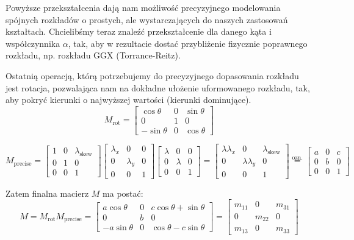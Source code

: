 \documentclass[../main.tex]{subfiles}
\begin{document}
Powyższe przekształcenia dają nam możliwość precyzyjnego modelowania spójnych rozkładów o prostych, ale wystarczających do naszych zastosowań kształtach. Chcielibśmy teraz znaleźć przekształcenie dla danego kąta i współczynnika $\alpha$, tak, aby w rezultacie dostać przybliżenie fizycznie poprawnego rozkładu, np. rozkładu GGX (Torrance-Reitz).

Ostatnią operacją, którą potrzebujemy do precyzyjnego dopasowania rozkładu jest rotacja, pozwalająca nam na dokładne ułożenie uformowanego rozkładu, tak, aby pokryć kierunki o najwyższej wartości (kierunki dominujące). 
\[
M_{\text{rot}} =
\begin{bmatrix}
\cos\theta  & 0     & \sin\theta \\
0           & 1     & 0 \\
-\sin\theta & 0     & \cos\theta
\end{bmatrix}
\]

\[
M_{\text{precise}} =
\begin{bmatrix}
1 & 0 & \lambda_{\text{skew}} \\
0 & 1 & 0 \\
0 & 0 & 1
\end{bmatrix}
\begin{bmatrix}
\lambda_x & 0 & 0 \\
0 & \lambda_y & 0 \\
0 & 0 & 1
\end{bmatrix}
\begin{bmatrix}
\lambda & 0 & 0 \\
0 & \lambda & 0 \\
0 & 0 & 1
\end{bmatrix}
=
\begin{bmatrix}
\lambda\lambda_x & 0 & \lambda_{\text{skew}} \\
0 & \lambda\lambda_y & 0 \\
0 & 0 & 1
\end{bmatrix}
\stackrel{\text{ozn.}}{=}
\begin{bmatrix}
a & 0 & c \\
0 & b & 0 \\
0 & 0 & 1
\end{bmatrix}
\]

Zatem finalna macierz $M$ ma postać:
\[
M = M_{\text{rot}} M_{\text{precise}} = \begin{bmatrix}
a\cos\theta & 0 & c\cos\theta + \sin\theta \\
0 & b & 0 \\
-a\sin\theta & 0 & \cos\theta - c \sin\theta
\end{bmatrix} = \begin{bmatrix}
m_{11} & 0 & m_{31} \\
0 & m_{22} & 0 \\
m_{13} & 0 & m_{33}
\end{bmatrix}
\]
\end{document}
